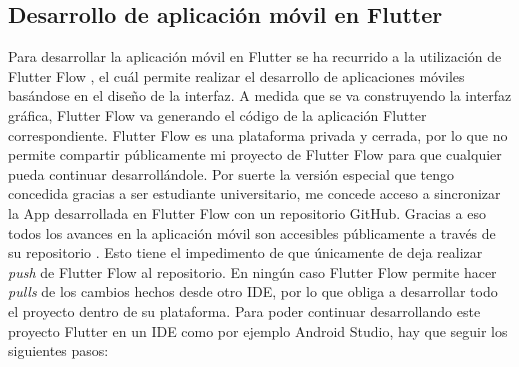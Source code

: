     \subsection{Desarrollo de aplicación móvil en Flutter}
    Para desarrollar la aplicación móvil en Flutter \cite{wiki:flutter} se ha recurrido a la utilización de Flutter Flow \cite{wiki:flutter_flow}, el cuál permite realizar el desarrollo de aplicaciones móviles basándose en el diseño de la interfaz. A medida que se va construyendo la interfaz gráfica, Flutter Flow va generando el código de la aplicación Flutter correspondiente. 
    Flutter Flow es una plataforma privada y cerrada, por lo que no permite compartir públicamente mi proyecto de Flutter Flow para que cualquier pueda continuar desarrollándole. Por suerte la versión especial que tengo concedida gracias a ser estudiante universitario, me concede acceso a sincronizar la App desarrollada en Flutter Flow con un repositorio GitHub. Gracias a eso todos los avances en la aplicación móvil son accesibles públicamente a través de su repositorio \cite{GreenInHouse:repo:AppMovil}. Esto tiene el impedimento de que únicamente de deja realizar \textit{push} de Flutter Flow al repositorio. En ningún caso Flutter Flow permite hacer \textit{pulls} de los cambios hechos desde otro IDE, por lo que obliga a desarrollar todo el proyecto dentro de su plataforma.
    Para poder continuar desarrollando este proyecto Flutter en un IDE como por ejemplo Android Studio, hay que seguir los siguientes pasos:
